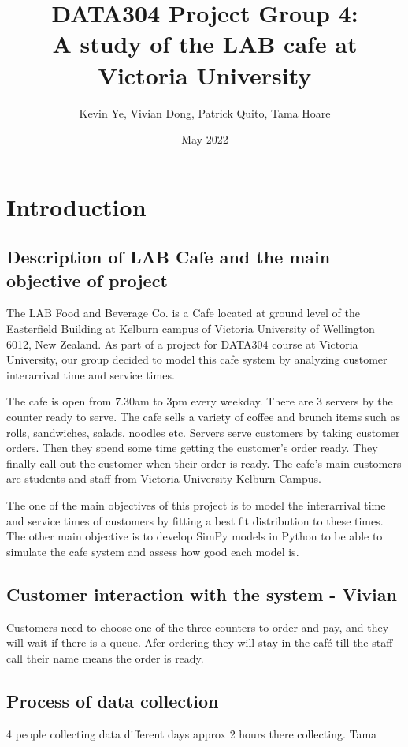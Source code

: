 \documentclass{article}
\title{\Huge DATA304 Project Group 4:\\
  \Huge A study of the LAB cafe at Victoria University}
\author{\Large Kevin Ye, Vivian Dong, Patrick Quito, Tama Hoare }
\date{\Large May 2022}
\begin{document}
\maketitle
\newpage

\section{Introduction}

\subsection{Description of LAB Cafe and the main objective of project}
The LAB Food and Beverage Co. is a Cafe located at ground level of the Easterfield Building at Kelburn campus of Victoria University of Wellington 6012, New Zealand. As part of a project for DATA304 course at Victoria University, our group decided to model this cafe system by analyzing customer interarrival time and service times. 

The cafe is open from 7.30am to 3pm every weekday. There are 3 servers by the counter ready to serve. The cafe sells a variety of coffee and brunch items such as rolls, sandwiches, salads, noodles etc. Servers serve customers by taking customer orders. Then they spend some time getting the customer's order ready. They finally call out the customer when their order is ready. The cafe's main customers are students and staff from Victoria University Kelburn Campus. 

The one of the main objectives of this project is to model the interarrival time and service times of customers by fitting a best fit distribution to these times. The other main objective is to develop SimPy models in Python to be able to simulate the cafe system and assess how good each model is.

\subsection{Customer interaction with the system - Vivian}
Customers need to choose one of the three counters to order and pay, and they will wait if there is a queue. Afer ordering they will stay in the café till the staff call their name means the order is ready.

\subsection{Process of data collection}
4 people collecting data
different days
approx 2 hours there collecting. Tama
\end{document}
